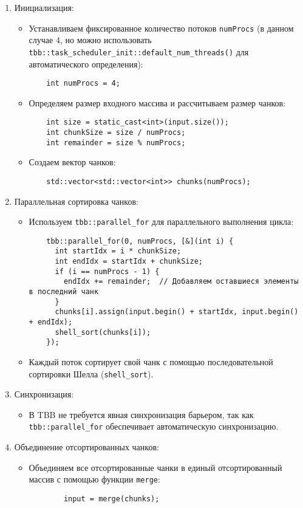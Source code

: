 \documentclass[]{article}
\theoremstyle{remark}
\theoremstyle{definition}
\newcommand{\cpp}[1]{\texttt{#1}}
\begin{document}
\begin{enumerate}
    \item Инициализация:
    \begin{itemize}
        \item Устанавливаем фиксированное количество потоков \cpp{numProcs} (в данном случае 4, но можно использовать \cpp{tbb::task_scheduler_init::default_num_threads()} для автоматического определения):
        \begin{verbatim}
    int numProcs = 4;
        \end{verbatim}

        \item Определяем размер входного массива и рассчитываем размер чанков:
        \begin{verbatim}
    int size = static_cast<int>(input.size());
    int chunkSize = size / numProcs;
    int remainder = size % numProcs;
        \end{verbatim}
    
        \item Создаем вектор чанков:
        \begin{verbatim}
    std::vector<std::vector<int>> chunks(numProcs);
        \end{verbatim}
    \end{itemize}
    \item Параллельная сортировка чанков:
    \begin{itemize}
        \item Используем \cpp{tbb::parallel_for} для параллельного выполнения цикла:
        \begin{verbatim}
    tbb::parallel_for(0, numProcs, [&](int i) {
      int startIdx = i * chunkSize;
      int endIdx = startIdx + chunkSize;
      if (i == numProcs - 1) {
        endIdx += remainder;  // Добавляем оставшиеся элементы в последний чанк
      }
      chunks[i].assign(input.begin() + startIdx, input.begin() + endIdx);
      shell_sort(chunks[i]);
    });
        \end{verbatim}

        \item Каждый поток сортирует свой чанк с помощью последовательной сортировки Шелла (\cpp{shell_sort}).
    \end{itemize}
    \item Синхронизация:
    \begin{itemize}
        \item В TBB не требуется явная синхронизация барьером, так как \cpp{tbb::parallel_for} обеспечивает автоматическую синхронизацию.
    \end{itemize}
    \item Объединение отсортированных чанков:
    \begin{itemize}
        \item Объединяем все отсортированные чанки в единый отсортированный массив с помощью функции \cpp{merge}:
        \begin{verbatim}
        input = merge(chunks);
        \end{verbatim}
    \end{itemize}
\end{enumerate}
\end{document}
